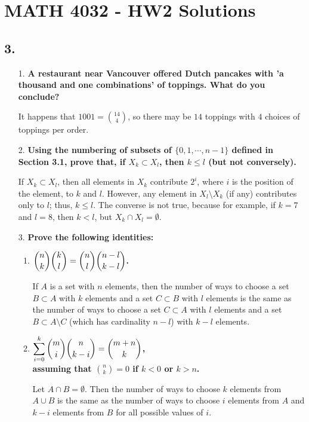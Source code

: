 \documentclass[a4paper,12pt]{article}
\begin{document}
\section*{MATH 4032 - HW2 Solutions}
\subsection*{3.}
\begin{enumerate}
    \item[1.]
        \boldmath
        \textbf{A restaurant near Vancouver offered Dutch pancakes with 'a thousand and one combinations' of toppings. What do you conclude?} \par
        \unboldmath
        It happens that $1001 = \binom{14}{4}$, so there may be $14$ toppings with $4$ choices of toppings per order.

    \item[2.]
        \boldmath
        \textbf{Using the numbering of subsets of $\{ 0, 1, \cdots, n - 1 \}$ defined in Section 3.1, prove that, if $X_k \subset X_l$, then $k \leq l$ (but not conversely).} \par
        \unboldmath
        If $X_k \subset X_l$, then all elements in $X_k$ contribute $2^i$, where $i$ is the position of the element, to $k$ and $l$. However, any element in $X_l \setminus X_k$ (if any) contributes only to $l$; thus, $k \leq l$. The converse is not true, because for example, if $k = 7$ and $l = 8$, then $k < l$, but $X_k \cap X_l = \emptyset$.

    \item[3.]
        \boldmath
        \textbf{Prove the following identities:} \par
        \unboldmath
        \begin{enumerate}
            \item
                \boldmath
                \textbf{$\dbinom{n}{k} \dbinom{k}{l} = \dbinom{n}{l} \dbinom{n - l}{k - l}$.} \par
                \unboldmath
                If $A$ is a set with $n$ elements, then the number of ways to choose a set $B \subset A$ with $k$ elements and a set $C \subset B$ with $l$ elements is the same as the number of ways to choose a set $C \subset A$ with $l$ elements and a set $B \subset A \setminus C$ (which has cardinality $n - l$) with $k - l$ elements.

            \item
                \boldmath
                \textbf{$\displaystyle\sum_{i = 0}^k \dbinom{m}{i} \dbinom{n}{k - i} = \dbinom{m + n}{k}$, \\ assuming that $\binom{n}{k} = 0$ if $k < 0$ or $k > n$.} \par
                \unboldmath
                Let $A \cap B = \emptyset$. Then the number of ways to choose $k$ elements from $A \cup B$ is the same as the number of ways to choose $i$ elements from $A$ and $k - i$ elements from $B$ for all possible values of $i$.


\end{enumerate}
\end{enumerate}
\end{document}
